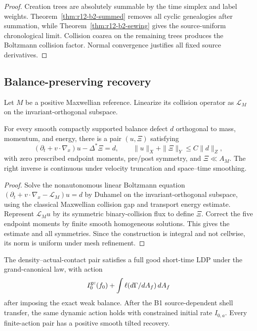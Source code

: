 \begin{proof}
Creation trees are absolutely summable by the time simplex and label weights.
Theorem~\ref{thm:r12-b2-summed} removes all cyclic genealogies after summation,
while Theorem~\ref{thm:r12-b2-sewing} gives the source-uniform chronological
limit.  Collision coarea on the remaining trees produces the Boltzmann
collision factor.  Normal convergence justifies all fixed source derivatives.
\end{proof}

\subsection{Balance-preserving recovery}

Let $M$ be a positive Maxwellian reference.  Linearize its collision operator
as $\mathcal L_M$ on the invariant-orthogonal subspace.

\begin{lemma}
\label{lem:r12-b2-repair}
For every smooth compactly supported balance defect $d$ orthogonal to mass,
momentum, and energy, there is a pair $(u,\Xi)$ satisfying
\[
 (\partial_t+v\cdot\nabla_x)u-\Delta^*\Xi=d,
 \qquad
 \|u\|_X+\|\Xi\|_Y\le C\|d\|_Z,
\]
with zero prescribed endpoint moments, pre/post symmetry, and
$\Xi\ll A_M$.  The right inverse is continuous under velocity truncation and
space--time smoothing.
\end{lemma}

\begin{proof}
Solve the nonautonomous linear Boltzmann equation
$(\partial_t+v\cdot\nabla_x-\mathcal L_M)u=d$ by Duhamel on the
invariant-orthogonal subspace, using the classical Maxwellian collision gap
and transport energy estimate.  Represent $\mathcal L_Mu$ by its symmetric
binary-collision flux to define $\Xi$.  Correct the five endpoint moments by
finite smooth homogeneous solutions.  This gives the estimate and all
symmetries.  Since the construction is integral and not cellwise, its norm is
uniform under mesh refinement.
\end{proof}

\begin{theorem}
\label{thm:r12-b2-ldp}
The density--actual-contact pair satisfies a full good short-time LDP under
the grand-canonical law, with action
\[
 I_0^{\rm gc}(f_0)+\int\ell(d\Gamma/dA_f)\,dA_f
\]
after imposing the exact weak balance.  After the B1 source-dependent shell
transfer, the same dynamic action holds with constrained initial rate
$I_{0,a}$.  Every finite-action pair has a positive smooth tilted recovery.
\end{theorem}

